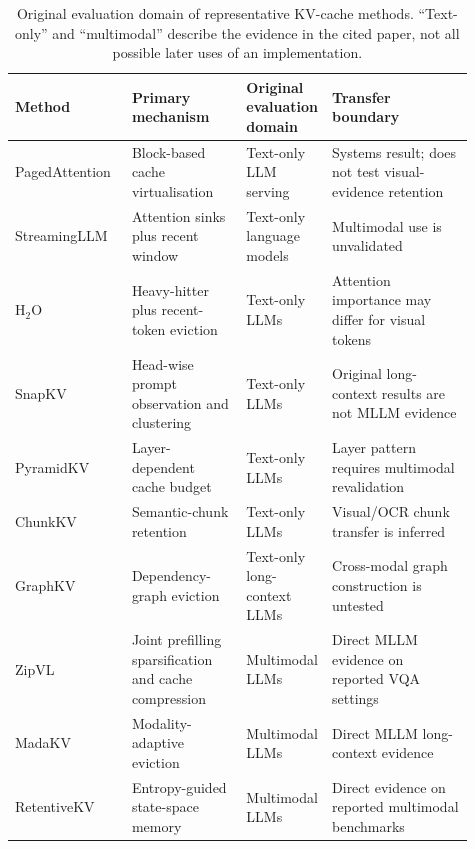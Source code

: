\documentclass[10pt]{article}
\newenvironment{reviewchange}{\begingroup\color{red}}{\endgroup}
\begin{document}
\begin{reviewchange}
\begin{table}[t]
\centering
\caption{Original evaluation domain of representative KV-cache methods.  ``Text-only''
and ``multimodal'' describe the evidence in the cited paper, not all possible later
uses of an implementation.}
\label{tab:kv-domain}
\small
\renewcommand{\arraystretch}{1.12}
\setlength{\tabcolsep}{3pt}
\begin{tabular}{p{0.17\linewidth} p{0.25\linewidth} p{0.18\linewidth} p{0.31\linewidth}}
\toprule
\textbf{Method} & \textbf{Primary mechanism} & \textbf{Original evaluation domain} & \textbf{Transfer boundary} \\
\midrule
PagedAttention~\citep{kwon2023efficientmemorymanagementlarge} & Block-based cache virtualisation & Text-only LLM serving & Systems result; does not test visual-evidence retention \\
StreamingLLM~\citep{xiao2024efficientstreaminglanguagemodels} & Attention sinks plus recent window & Text-only language models & Multimodal use is unvalidated \\
H$_2$O~\citep{zhang2023h2oheavyhitteroracleefficient} & Heavy-hitter plus recent-token eviction & Text-only LLMs & Attention importance may differ for visual tokens \\
SnapKV~\citep{li2024snapkvllmknowslooking} & Head-wise prompt observation and clustering & Text-only LLMs & Original long-context results are not MLLM evidence \\
PyramidKV~\citep{cai2025pyramidkvdynamickvcache} & Layer-dependent cache budget & Text-only LLMs & Layer pattern requires multimodal revalidation \\
ChunkKV~\citep{liu2025chunkkvsemanticpreservingkvcache} & Semantic-chunk retention & Text-only LLMs & Visual/OCR chunk transfer is inferred \\
GraphKV~\citep{li2025graphkvbreakingstaticselection} & Dependency-graph eviction & Text-only long-context LLMs & Cross-modal graph construction is untested \\
ZipVL~\citep{he2024zipvlefficientlargevisionlanguage} & Joint prefilling sparsification and cache compression & Multimodal LLMs & Direct MLLM evidence on reported VQA settings \\
MadaKV~\citep{li2025madakvadaptivemodalityperceptionkv} & Modality-adaptive eviction & Multimodal LLMs & Direct MLLM long-context evidence \\
RetentiveKV~\citep{liu2026retentivekvstatespacememoryuncertaintyaware} & Entropy-guided state-space memory & Multimodal LLMs & Direct evidence on reported multimodal benchmarks \\
\bottomrule
\end{tabular}
\end{table}
\end{reviewchange}
\end{document}
